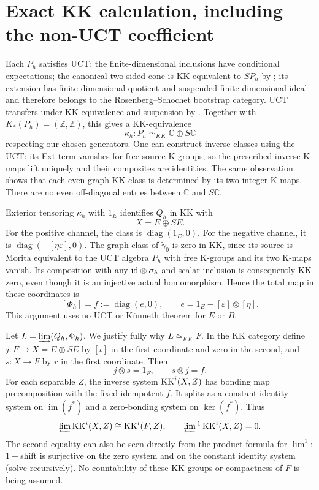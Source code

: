 \documentclass[11pt]{article}
\theoremstyle{remark}\newtheorem{remark}[theorem]{Remark}
\newcommand{\Z}{\mathbb Z}\newcommand{\C}{\mathbb C}
\begin{document}
\section{Exact KK calculation, including the non-UCT coefficient}
Each $P_h$ satisfies UCT: the finite-dimensional inclusions have
conditional expectations; the canonical two-sided cone is KK-equivalent
to $SP_h$ by \cite[Theorem 4.1]{FG}; its extension has finite-dimensional
quotient and suspended finite-dimensional ideal and therefore belongs
to the Rosenberg--Schochet bootstrap category. UCT transfers under
KK-equivalence and suspension by \cite[Theorem 1.17, Proposition 7.1]{RS}.
Together with $K_*(P_h)=(\Z,\Z)$, this gives a KK-equivalence
\[
                 \kappa_h:P_h\simeq_{KK}\C\oplus S\C
\]
respecting our chosen generators. One can construct inverse classes
using the UCT: its Ext term vanishes for free source K-groups, so the
prescribed inverse K-maps lift uniquely and their composites are identities.
The same observation shows that each even graph KK class is determined
by its two integer K-maps. There are no even off-diagonal entries between
$\C$ and $S\C$.

Exterior tensoring $\kappa_h$ with $1_E$ identifies $Q_h$ in KK with
\[
                            X=E\oplus SE.
\]
For the positive channel, the class is $\operatorname{diag}(1_E,0)$.
For the negative channel, it is
$\operatorname{diag}(-[\eta\varepsilon],0)$.
The graph class of $\widetilde\gamma_0$ is zero in KK, since its source
is Morita equivalent to the UCT algebra $P_h$ with free K-groups and
its two K-maps vanish. Its composition with any $\mathrm{id}\otimes\sigma_h$
and scalar inclusion is consequently KK-zero, even though it is an
injective actual homomorphism. Hence the total map in these coordinates is
\begin{equation}\label{eq:idempotent}
                   [\Phi_h]=f:=\operatorname{diag}(e,0),
                   \qquad e=1_E-[\varepsilon]\otimes[\eta].
\end{equation}
This argument uses no UCT or K\"unneth theorem for $E$ or $B$.

Let $L=\varinjlim(Q_h,\Phi_h)$. We justify fully why $L\simeq_{KK}F$.
In the KK category define $j:F\to X=E\oplus SE$ by $[\iota]$ in the
first coordinate and zero in the second, and $s:X\to F$ by $r$ in the
first coordinate. Then
\[
                  j\otimes s=1_F,\qquad s\otimes j=f.
\]
For each separable $Z$, the inverse system $\operatorname{KK}^i(X,Z)$ has bonding map
precomposition with the fixed idempotent $f$. It splits as a constant
identity system on $\operatorname{im}(f^*)$ and a zero-bonding system on
$\ker(f^*)$. Thus
\[
 \varprojlim\operatorname{KK}^i(X,Z)\cong\operatorname{KK}^i(F,Z),\qquad
 \varprojlim{}^1\operatorname{KK}^i(X,Z)=0.
\]
The second equality can also be seen directly from the product formula
for $\lim^1$: $1-$shift is surjective on the zero system and on the
constant identity system (solve recursively). No countability of these
KK groups or compactness of $F$ is being assumed.
\end{document}
